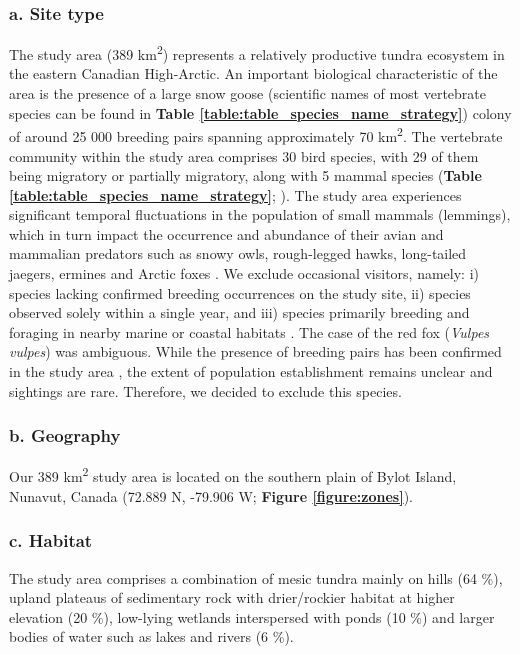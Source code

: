 \documentclass[a4paper,twoside,12pt]{article}
\begin{document}
                        \subsubsection*{a. Site type}
  The study area (389 km\textsuperscript{2}) represents a relatively productive tundra ecosystem in the eastern Canadian High-Arctic. An important biological characteristic of the area is the presence of a large snow goose (scientific names of most vertebrate species can be found in \textbf{Table \ref{table:table_species_name_strategy}}) colony of around 25 000 breeding pairs \citep{reed2002} spanning approximately 70 km\textsuperscript{2}. The vertebrate community within the study area comprises 30 bird species, with 29 of them being migratory or partially migratory, along with 5 mammal species (\textbf{Table \ref{table:table_species_name_strategy}}; \citet{moisan2023, gauthier2024a}). The study area experiences significant temporal fluctuations in the population of small mammals (lemmings), which in turn impact the occurrence and abundance of their avian and mammalian predators such as snowy owls, rough-legged hawks, long-tailed jaegers, ermines and Arctic foxes \citep{legagneux2012, duchesne2021}. We exclude occasional visitors, namely: i) species lacking confirmed breeding occurrences on the study site, ii) species observed solely within a single year, and iii) species primarily breeding and foraging in nearby marine or coastal habitats \citep{moisan2023}. The case of the red fox (\textit{Vulpes vulpes}) was ambiguous. While the presence of breeding pairs has been confirmed in the study area \citep{lai2022}, the extent of population establishment remains unclear and sightings are rare. Therefore, we decided to exclude this species.
                        
\newpage
                \subsubsection*{b. Geography} Our 389 km\textsuperscript{2} study area is located on the southern plain of Bylot Island, Nunavut, Canada (72.889 N, -79.906 W; \textbf{Figure \ref{figure:zones}}).
                \subsubsection*{c. Habitat}  The study area comprises a combination of mesic tundra mainly on hills (64 \%), upland plateaus of sedimentary rock with drier/rockier habitat at higher elevation (20 \%), low-lying wetlands interspersed with ponds (10 \%) and larger bodies of water such as lakes and rivers (6 \%).
\end{document}
